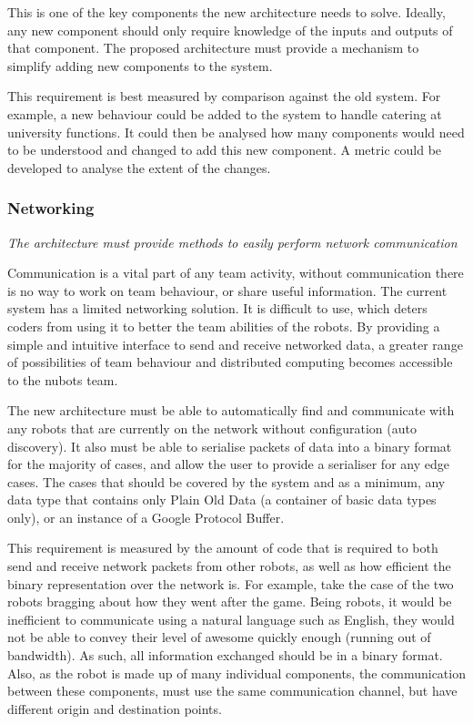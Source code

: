 \documentclass[english,12pt]{scrartcl}
\newcommand{\requirement}[1]{\textit{#1}}
\begin{document}
				This is one of the key components the new architecture needs to solve.
				Ideally, any new component should only require knowledge of the inputs and outputs of that component.
				The proposed architecture must provide a mechanism to simplify adding new components to the system.
	
				This requirement is best measured by comparison against the old system.
				For example, a new behaviour could be added to the system to handle catering at university functions.
				It could then be analysed how many components would need to be understood and changed to add this new component. A metric could be developed to analyse the extent of the changes. 

			\subsubsection{Networking}
				\requirement{The architecture must provide methods to easily perform network
				communication}
	
				Communication is a vital part of any team activity, without communication there is no way to work on team behaviour, or share useful information.
				The current system has a limited networking solution.
				It is difficult to use, which deters coders from using it to better the team abilities of the robots.
				By providing a simple and intuitive interface to send and receive networked data, a greater range of possibilities of team behaviour and distributed computing becomes accessible to the \gls{nubots} team.
	
				The new architecture must be able to automatically find and communicate with any robots that are currently on the network without configuration (auto discovery).
				It also must be able to serialise packets of data into a binary format for the majority of cases, and allow the user to provide a serialiser for any edge cases.
				The cases that should be covered by the system and as a minimum, any data type that contains only Plain Old Data (a container of basic data types only), or an instance of a Google Protocol Buffer.
	
				This requirement is measured by the amount of code that is required to both send and receive network packets from other robots, as well as how efficient the binary representation over the network is.
				For example, take the case of the two robots bragging about how they went after the game.
				Being robots, it would be inefficient to communicate using a natural language such as English, they would not be able to convey their level of awesome quickly enough (running out of bandwidth).
				As such, all information exchanged should be in a binary format.
				Also, as the robot is made up of many individual components, the communication between these components, must use the same communication channel, but have different origin and destination points.
\end{document}
